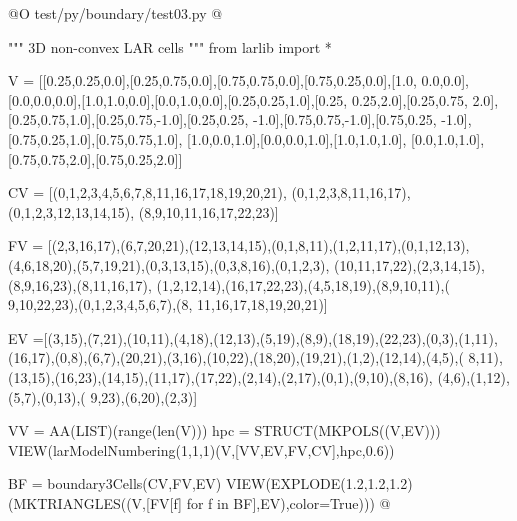 \documentclass[11pt,oneside]{article}    %
\begin{document}
@O test/py/boundary/test03.py
@{""" 3D non-convex LAR cells """
from larlib import *

V = [[0.25,0.25,0.0],[0.25,0.75,0.0],[0.75,0.75,0.0],[0.75,0.25,0.0],[1.0, 0.0,0.0],
[0.0,0.0,0.0],[1.0,1.0,0.0],[0.0,1.0,0.0],[0.25,0.25,1.0],[0.25, 0.25,2.0],[0.25,0.75,
2.0],[0.25,0.75,1.0],[0.25,0.75,-1.0],[0.25,0.25, -1.0],[0.75,0.75,-1.0],[0.75,0.25,
-1.0],[0.75,0.25,1.0],[0.75,0.75,1.0], [1.0,0.0,1.0],[0.0,0.0,1.0],[1.0,1.0,1.0],
[0.0,1.0,1.0],[0.75,0.75,2.0],[0.75,0.25,2.0]]

CV = [(0,1,2,3,4,5,6,7,8,11,16,17,18,19,20,21), (0,1,2,3,8,11,16,17),
(0,1,2,3,12,13,14,15), (8,9,10,11,16,17,22,23)]

FV = [(2,3,16,17),(6,7,20,21),(12,13,14,15),(0,1,8,11),(1,2,11,17),(0,1,12,13),
(4,6,18,20),(5,7,19,21),(0,3,13,15),(0,3,8,16),(0,1,2,3),
(10,11,17,22),(2,3,14,15),(8,9,16,23),(8,11,16,17),
(1,2,12,14),(16,17,22,23),(4,5,18,19),(8,9,10,11),(
9,10,22,23),(0,1,2,3,4,5,6,7),(8, 11,16,17,18,19,20,21)]

EV =[(3,15),(7,21),(10,11),(4,18),(12,13),(5,19),(8,9),(18,19),(22,23),(0,3),(1,11),
(16,17),(0,8),(6,7),(20,21),(3,16),(10,22),(18,20),(19,21),(1,2),(12,14),(4,5),(
8,11),(13,15),(16,23),(14,15),(11,17),(17,22),(2,14),(2,17),(0,1),(9,10),(8,16),
(4,6),(1,12),(5,7),(0,13),( 9,23),(6,20),(2,3)]

VV = AA(LIST)(range(len(V)))
hpc = STRUCT(MKPOLS((V,EV)))
VIEW(larModelNumbering(1,1,1)(V,[VV,EV,FV,CV],hpc,0.6))

BF = boundary3Cells(CV,FV,EV)
VIEW(EXPLODE(1.2,1.2,1.2)(MKTRIANGLES((V,[FV[f] for f in BF],EV),color=True)))
@}
\end{document}
